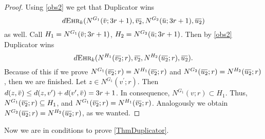 \documentclass[12pt,notitlepage,a4paper]{article}
\theoremstyle{definition}
\newcommand{\overbar}[1]{\mkern 1.5mu\overline{\mkern-1.5mu#1\mkern-1.5mu}\mkern 1.5mu}
\newcommand{\ehr}{\textsc{Ehr}}
\begin{document}
\begin{proof}
	Using \cref{obs2} we get that Duplicator wins 
	\[d\ehr_k(N^{G_1}(\overbar{v};3r+1),\overbar{v_2},N^{G_2}(\overbar{u};3r+1)
	,\overbar{u_2})\]
	as well. Call $H_1=N^{G_1}(\overbar{v};3r+1)$,
	$H_2=N^{G_2}(\overbar{u};3r+1)$. Then by \cref{obs2}
	Duplicator wins
	\[
	d\ehr_k(N^{H_1}(\overbar{v_2};r),\overbar{v_2},N^{H_2}(\overbar{u_2};r),\overbar{u_2}).
	\]
	Because of this if we prove $N^{G_1}(\overbar{v_2};r)
	=N^{H_1}(\overbar{v_2};r)$ and $N^{G_2}(\overbar{u_2};r)
	=N^{H_2}(\overbar{u_2};r)$, then we are finished. 
	Let $z\in N^{G_1}(v^\prime;r)$. Then
	$d(z,\overbar{v})\leq d(z,v^\prime)+d(v^\prime,\overbar{v})=3r+1$.
	In consequence, $N^{G_1}(v;r)\subset H_1$. Thus,
	$N^{G_1}(\overbar{v_2};r)\subseteq H_1$, and $N^{G_1}(\overbar{v_2};r)
	=N^{H_1}(\overbar{v_2};r)$. Analogously we obtain 
	$N^{G_2}(\overbar{u_2};r)=N^{H_2}(\overbar{u_2};r)$, as we wanted. 
\end{proof}

Now we are in conditions to prove \cref{ThmDuplicator}.
\end{document}
